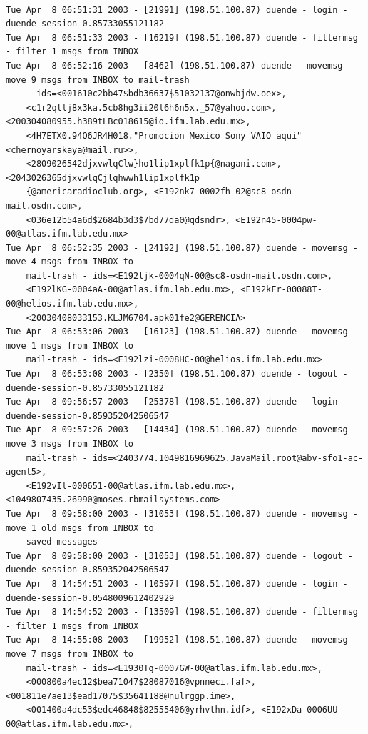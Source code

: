 \begin{lstlisting}[style=terminal]

Tue Apr  8 06:51:31 2003 - [21991] (198.51.100.87) duende - login - duende-session-0.85733055121182
Tue Apr  8 06:51:33 2003 - [16219] (198.51.100.87) duende - filtermsg - filter 1 msgs from INBOX
Tue Apr  8 06:52:16 2003 - [8462] (198.51.100.87) duende - movemsg - move 9 msgs from INBOX to mail-trash 
    - ids=<001610c2bb47$bdb36637$51032137@onwbjdw.oex>, 
    <c1r2qllj8x3ka.5cb8hg3ii20l6h6n5x._57@yahoo.com>, <200304080955.h389tLBc018615@io.ifm.lab.edu.mx>, 
    <4H7ETX0.94Q6JR4H018."Promocion Mexico Sony VAIO aqui"<chernoyarskaya@mail.ru>>, 
    <2809026542djxvwlqClw}ho1lip1xplfk1p{@nagani.com>, <2043026365djxvwlqCjlqhwwh1lip1xplfk1p
    {@americaradioclub.org>, <E192nk7-0002fh-02@sc8-osdn-mail.osdn.com>, 
    <036e12b54a6d$2684b3d3$7bd77da0@qdsndr>, <E192n45-0004pw-00@atlas.ifm.lab.edu.mx>
Tue Apr  8 06:52:35 2003 - [24192] (198.51.100.87) duende - movemsg - move 4 msgs from INBOX to 
    mail-trash - ids=<E192ljk-0004qN-00@sc8-osdn-mail.osdn.com>, 
    <E192lKG-0004aA-00@atlas.ifm.lab.edu.mx>, <E192kFr-00088T-00@helios.ifm.lab.edu.mx>, 
    <20030408033153.KLJM6704.apk01fe2@GERENCIA>
Tue Apr  8 06:53:06 2003 - [16123] (198.51.100.87) duende - movemsg - move 1 msgs from INBOX to 
    mail-trash - ids=<E192lzi-0008HC-00@helios.ifm.lab.edu.mx>
Tue Apr  8 06:53:08 2003 - [2350] (198.51.100.87) duende - logout - duende-session-0.85733055121182
Tue Apr  8 09:56:57 2003 - [25378] (198.51.100.87) duende - login - duende-session-0.859352042506547
Tue Apr  8 09:57:26 2003 - [14434] (198.51.100.87) duende - movemsg - move 3 msgs from INBOX to 
    mail-trash - ids=<2403774.1049816969625.JavaMail.root@abv-sfo1-ac-agent5>, 
    <E192vIl-000651-00@atlas.ifm.lab.edu.mx>, <1049807435.26990@moses.rbmailsystems.com>
Tue Apr  8 09:58:00 2003 - [31053] (198.51.100.87) duende - movemsg - move 1 old msgs from INBOX to 
    saved-messages
Tue Apr  8 09:58:00 2003 - [31053] (198.51.100.87) duende - logout - duende-session-0.859352042506547
Tue Apr  8 14:54:51 2003 - [10597] (198.51.100.87) duende - login - duende-session-0.0548009612402929
Tue Apr  8 14:54:52 2003 - [13509] (198.51.100.87) duende - filtermsg - filter 1 msgs from INBOX
Tue Apr  8 14:55:08 2003 - [19952] (198.51.100.87) duende - movemsg - move 7 msgs from INBOX to 
    mail-trash - ids=<E1930Tg-0007GW-00@atlas.ifm.lab.edu.mx>, 
    <000800a4ec12$bea71047$28087016@vpnneci.faf>, <001811e7ae13$ead17075$35641188@nulrggp.ime>, 
    <001400a4dc53$edc46848$82555406@yrhvthn.idf>, <E192xDa-0006UU-00@atlas.ifm.lab.edu.mx>, 

\end{lstlisting}
